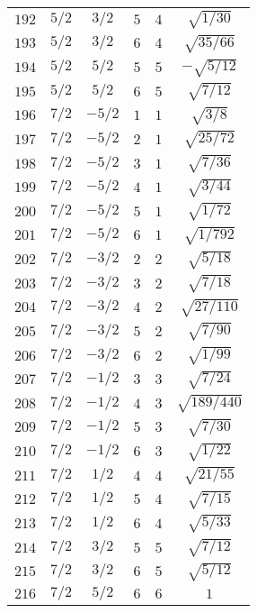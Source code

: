 \begin{table}
\begin{center}
\begin{tabular}{|c|c|c|c|c|c|}
$192$ & $5/2$ & $3/2$ & $5$ & $4$ & $\sqrt{1/30}$ \\ 
$193$ & $5/2$ & $3/2$ & $6$ & $4$ & $\sqrt{35/66}$ \\ 
$194$ & $5/2$ & $5/2$ & $5$ & $5$ & $-\sqrt{5/12}$ \\ 
$195$ & $5/2$ & $5/2$ & $6$ & $5$ & $\sqrt{7/12}$ \\ 
$196$ & $7/2$ & $-5/2$ & $1$ & $1$ & $\sqrt{3/8}$ \\ 
$197$ & $7/2$ & $-5/2$ & $2$ & $1$ & $\sqrt{25/72}$ \\ 
$198$ & $7/2$ & $-5/2$ & $3$ & $1$ & $\sqrt{7/36}$ \\ 
$199$ & $7/2$ & $-5/2$ & $4$ & $1$ & $\sqrt{3/44}$ \\ 
$200$ & $7/2$ & $-5/2$ & $5$ & $1$ & $\sqrt{1/72}$ \\ 
$201$ & $7/2$ & $-5/2$ & $6$ & $1$ & $\sqrt{1/792}$ \\ 
$202$ & $7/2$ & $-3/2$ & $2$ & $2$ & $\sqrt{5/18}$ \\ 
$203$ & $7/2$ & $-3/2$ & $3$ & $2$ & $\sqrt{7/18}$ \\ 
$204$ & $7/2$ & $-3/2$ & $4$ & $2$ & $\sqrt{27/110}$ \\ 
$205$ & $7/2$ & $-3/2$ & $5$ & $2$ & $\sqrt{7/90}$ \\ 
$206$ & $7/2$ & $-3/2$ & $6$ & $2$ & $\sqrt{1/99}$ \\ 
$207$ & $7/2$ & $-1/2$ & $3$ & $3$ & $\sqrt{7/24}$ \\ 
$208$ & $7/2$ & $-1/2$ & $4$ & $3$ & $\sqrt{189/440}$ \\ 
$209$ & $7/2$ & $-1/2$ & $5$ & $3$ & $\sqrt{7/30}$ \\ 
$210$ & $7/2$ & $-1/2$ & $6$ & $3$ & $\sqrt{1/22}$ \\ 
$211$ & $7/2$ & $1/2$ & $4$ & $4$ & $\sqrt{21/55}$ \\ 
$212$ & $7/2$ & $1/2$ & $5$ & $4$ & $\sqrt{7/15}$ \\ 
$213$ & $7/2$ & $1/2$ & $6$ & $4$ & $\sqrt{5/33}$ \\ 
$214$ & $7/2$ & $3/2$ & $5$ & $5$ & $\sqrt{7/12}$ \\ 
$215$ & $7/2$ & $3/2$ & $6$ & $5$ & $\sqrt{5/12}$ \\ 
$216$ & $7/2$ & $5/2$ & $6$ & $6$ & $1$ \\ 
\hline 
\end{tabular}
\end{center}
\end{table}

